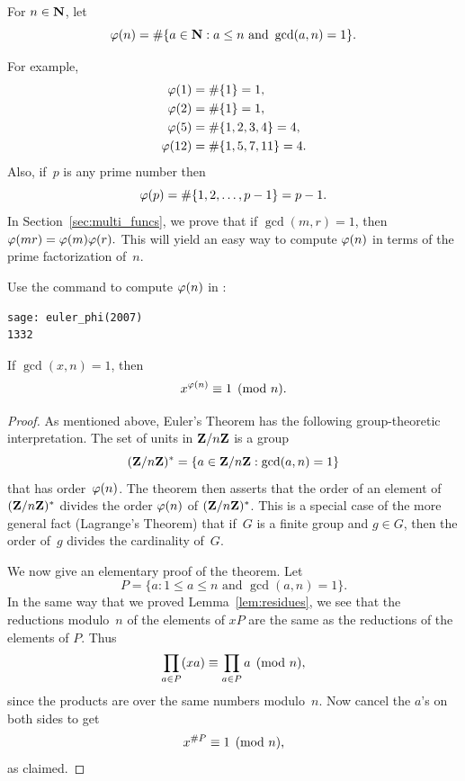 \begin{definition}\label{def:phi}
For $n\in\mathbf{N}$, let
$$
 \varphi(n) = \#\{a \in \mathbf{N} : a \leq n \text{ and } \gcd(a,n)=1\}.
$$
\end{definition}
For example,
\begin{align*}
 \varphi(1) &= \#\{1\} = 1,\\
 \varphi(2) &= \#\{1\} = 1,\\
 \varphi(5) &= \#\{1,2,3,4\} = 4,\\
 \varphi(12) &= \#\{1,5,7,11\} = 4.\\
\end{align*}
Also, if~$p$ is any prime number then
$$
   \varphi(p) = \#\{1,2,\ldots,p-1\} = p-1.
$$
In Section~\ref{sec:multi_funcs}, we prove
that if $\gcd(m,r)=1$, then $\varphi(mr)=\varphi(m)\varphi(r).$  This will
yield an easy way to compute $\varphi(n)$ in terms of the prime
factorization of~$n$.
\begin{sg}
Use the  command to compute $\varphi(n)$
in \sage:
\begin{verbatim}
sage: euler_phi(2007)
1332
\end{verbatim}
\end{sg}

\begin{theorem}\label{thm:fermatlittle}
If $\gcd(x,n)=1$, then
$$
   x^{\varphi(n)} \equiv 1\pmod{n}.
$$
\end{theorem}
\begin{proof}
As mentioned above, Euler's Theorem has the following group-theoretic
interpretation.  The set of units in $\mathbf{Z}/n\mathbf{Z}{}$ is a group
$$
(\mathbf{Z}/n\mathbf{Z}{})^*
= \{ a \in \mathbf{Z}/n\mathbf{Z}{} : \gcd(a,n) = 1\}
$$
that has order~$\varphi(n)$.  The theorem then asserts
that the order of an element of $(\mathbf{Z}/n\mathbf{Z}{})^*$ divides the order
$\varphi(n)$ of $(\mathbf{Z}/n\mathbf{Z}{})^*$.   This is a special case of the more
general fact (Lagrange's Theorem) that if~$G$ is a finite group and
$g\in G$, then the order of~$g$ divides the cardinality of~$G$.

We now give an elementary proof of the theorem.  Let
$$
  P = \{ a : 1\leq a \leq n \text{ and } \gcd(a,n) = 1\}.
$$
In the same way that we proved Lemma~\ref{lem:residues},
we see that the reductions modulo~$n$ of the elements of $xP$
are the same as the reductions of the elements of $P$.
Thus
$$
 \prod_{a\in P} (xa) \equiv \prod_{a \in P} a \pmod{n},
$$
since the products are over the same numbers modulo~$n$.
Now cancel the $a$'s on both sides to get
$$x^{\#P} \equiv 1\pmod{n},$$
as claimed.
\end{proof}

